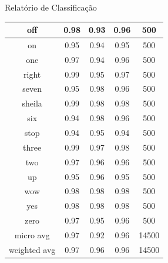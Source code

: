 \documentclass[10pt, compress]{beamer}
\begin{document}
\begin{frame}{Relatório de Classificação}
\begin{table}
\begin{tabular}{|c|c|c|c|c|}
\hline
         off &      0.98  &    0.93  &    0.96 &      500 \\ \hline
          on &      0.95  &    0.94  &    0.95 &      500 \\ \hline
         one &      0.97  &    0.94  &    0.96 &      500 \\ \hline
       right &      0.99  &    0.95  &    0.97 &      500 \\ \hline
       seven &      0.95  &    0.98  &    0.96 &      500 \\ \hline
      sheila &      0.99  &    0.98  &    0.98 &      500 \\ \hline
         six &      0.94  &    0.98  &    0.96 &      500 \\ \hline
        stop &      0.94  &    0.95  &    0.94 &      500 \\ \hline
       three &      0.99  &    0.97  &    0.98 &      500 \\ \hline
         two &      0.97  &    0.96  &    0.96 &      500 \\ \hline
          up &      0.95  &    0.96  &    0.95 &      500 \\ \hline
         wow &      0.98  &    0.98  &    0.98 &      500 \\ \hline
         yes &      0.98  &    0.98  &    0.98 &      500 \\ \hline
        zero &      0.97  &    0.95  &    0.96 &      500 \\ \hline

   micro avg &      \alert{0.97}   &   0.92  &    0.96 &    14500 \\ 
weighted avg &      0.97   &   0.96  &    0.96 &    14500 \\ \hline
\end{tabular}
\end{table}
\end{frame}
\end{document}
